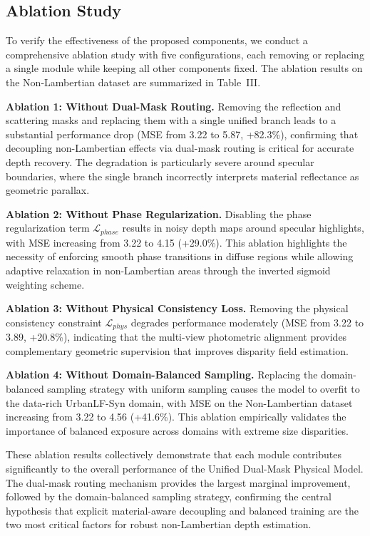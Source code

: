 \documentclass[lettersize,journal]{IEEEtran}
\begin{document}
\subsection{Ablation Study}

To verify the effectiveness of the proposed components, we conduct a comprehensive ablation study with five configurations, each removing or replacing a single module while keeping all other components fixed. The ablation results on the Non-Lambertian dataset are summarized in Table~III.

\textbf{Ablation 1: Without Dual-Mask Routing.} Removing the reflection and scattering masks and replacing them with a single unified branch leads to a substantial performance drop (MSE from 3.22 to 5.87, +82.3\%), confirming that decoupling non-Lambertian effects via dual-mask routing is critical for accurate depth recovery. The degradation is particularly severe around specular boundaries, where the single branch incorrectly interprets material reflectance as geometric parallax.

\textbf{Ablation 2: Without Phase Regularization.} Disabling the phase regularization term $\mathcal{L}_{phase}$ results in noisy depth maps around specular highlights, with MSE increasing from 3.22 to 4.15 (+29.0\%). This ablation highlights the necessity of enforcing smooth phase transitions in diffuse regions while allowing adaptive relaxation in non-Lambertian areas through the inverted sigmoid weighting scheme.

\textbf{Ablation 3: Without Physical Consistency Loss.} Removing the physical consistency constraint $\mathcal{L}_{phys}$ degrades performance moderately (MSE from 3.22 to 3.89, +20.8\%), indicating that the multi-view photometric alignment provides complementary geometric supervision that improves disparity field estimation.

\textbf{Ablation 4: Without Domain-Balanced Sampling.} Replacing the domain-balanced sampling strategy with uniform sampling causes the model to overfit to the data-rich UrbanLF-Syn domain, with MSE on the Non-Lambertian dataset increasing from 3.22 to 4.56 (+41.6\%). This ablation empirically validates the importance of balanced exposure across domains with extreme size disparities.

These ablation results collectively demonstrate that each module contributes significantly to the overall performance of the Unified Dual-Mask Physical Model. The dual-mask routing mechanism provides the largest marginal improvement, followed by the domain-balanced sampling strategy, confirming the central hypothesis that explicit material-aware decoupling and balanced training are the two most critical factors for robust non-Lambertian depth estimation.
\end{document}
